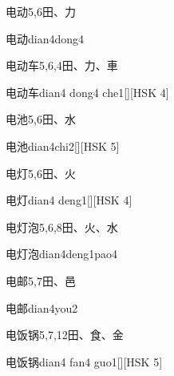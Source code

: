 \begin{entry}{电动}{5,6}{⽥、⼒}
  \begin{phonetics}{电动}{dian4dong4}
  \end{phonetics}
\end{entry}

\begin{entry}{电动车}{5,6,4}{⽥、⼒、⾞}
  \begin{phonetics}{电动车}{dian4 dong4 che1}[][HSK 4]
  \end{phonetics}
\end{entry}

\begin{entry}{电池}{5,6}{⽥、⽔}
  \begin{phonetics}{电池}{dian4chi2}[][HSK 5]
  \end{phonetics}
\end{entry}

\begin{entry}{电灯}{5,6}{⽥、⽕}
  \begin{phonetics}{电灯}{dian4 deng1}[][HSK 4]
  \end{phonetics}
\end{entry}

\begin{entry}{电灯泡}{5,6,8}{⽥、⽕、⽔}
  \begin{phonetics}{电灯泡}{dian4deng1pao4}
  \end{phonetics}
\end{entry}

\begin{entry}{电邮}{5,7}{⽥、⾢}
  \begin{phonetics}{电邮}{dian4you2}
  \end{phonetics}
\end{entry}

\begin{entry}{电饭锅}{5,7,12}{⽥、⾷、⾦}
  \begin{phonetics}{电饭锅}{dian4 fan4 guo1}[][HSK 5]
  \end{phonetics}
\end{entry}

